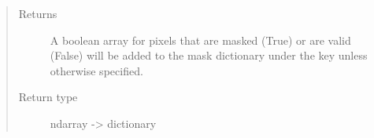 \documentclass[letterpaper,10pt,english]{sphinxmanual}
\begin{document}
\begin{fulllineitems}
\begin{quote}
\begin{description}
\begin{itemize}
\end{itemize}

\item[{Returns}] \leavevmode
{} \textendash{} A boolean array for pixels that are masked (True) or are valid
(False) will be added to the mask dictionary under the
key  unless otherwise specified.

\item[{Return type}] \leavevmode
ndarray -\textgreater{} dictionary

\end{description}\end{quote}

\end{fulllineitems}

\end{document}
